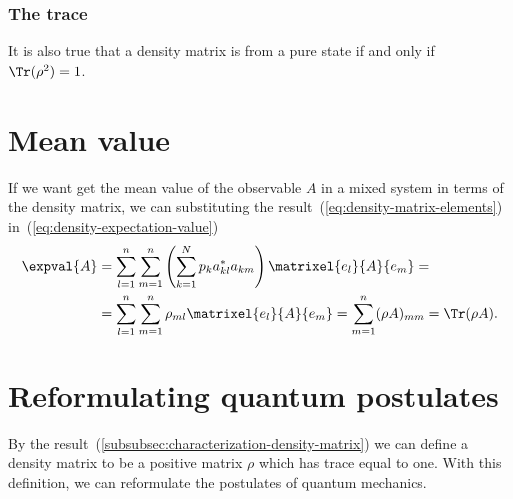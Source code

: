 \subsubsection{The trace}
It is also true that a density matrix is from a pure state if and only if $\Tr(\rho^2)=1$.

\section{Mean value}
If we want get the mean value of the observable $A$ in a mixed system in terms of the density matrix, we can
substituting the result~(\ref{eq:density-matrix-elements}) in~(\ref{eq:density-expectation-value})
\begin{equation}
    \begin{split}
    \label{eq:density-expectation-value-trace}
    \expval{A} & =\sum_{l=1}^n\sum_{m=1}^n \left(\sum_{k=1}^N p_k a_{kl}^* a_{km}\right)\matrixel{e_l}{A}{e_m}=\\
    &=\sum_{l=1}^n\sum_{m=1}^n \rho_{ml}\matrixel{e_l}{A}{e_m}=\sum_{m=1}^n(\rho A)_{mm}=\Tr(\rho A).
    \end{split}
\end{equation}

\section{Reformulating quantum postulates}
By the result~(\ref{subsubsec:characterization-density-matrix}) we can define a density matrix to be a positive matrix $\rho$ which has trace equal to one.
With this definition, we can reformulate the postulates of quantum mechanics.

